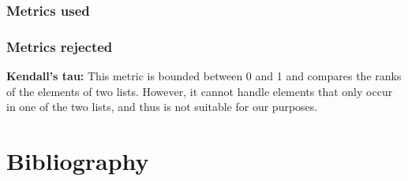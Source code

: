 \documentclass{article}
\begin{document}
\subsubsection{Metrics used}

\subsubsection{Metrics rejected}
\begin{description}
    \item \textbf{Kendall's tau:} This metric is bounded between 0 and 1 and compares the ranks of the elements of two lists. However, it cannot handle elements that only occur in one of the two lists, and thus is not suitable for our purposes.
    \item \textbf{}
\end{description}



\section{Bibliography}


\end{document}
